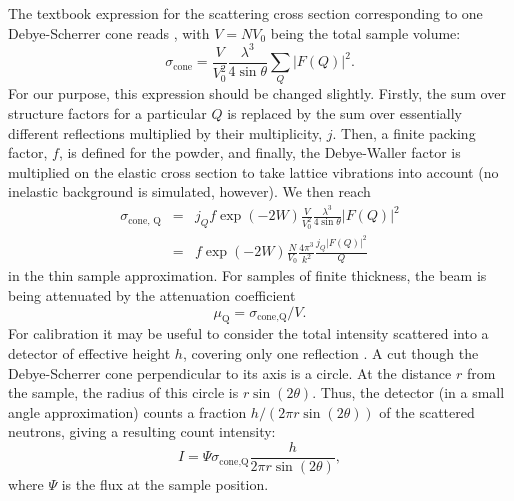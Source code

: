 The textbook expression for the scattering cross section
corresponding to one Debye-Scherrer cone reads \cite[ch.3.6]{squires}, with $V=N V_0$ being the total sample volume:
\begin{equation}
\sigma_\textrm{cone}
  = \frac{V}{V_0^2} \frac{\lambda^3}{4 \sin \theta} \sum_Q |F(Q)|^2 .
\end{equation}
For our purpose, this expression should be changed slightly.
Firstly, the sum over structure factors for a particular $Q$ is replaced
by the sum over essentially different reflections multiplied by their
multiplicity, $j$. Then, a finite packing factor, $f$, is defined for the powder,
and finally, the Debye-Waller factor is multiplied on the elastic cross section
to take lattice vibrations into account (no inelastic background is simulated,
however). We then reach
\begin{eqnarray}
\sigma_\textrm{cone, Q}
 & = & j_Q f \exp(-2W) \frac{V}{V_0^2} \frac{\lambda^3}{4 \sin \theta} |F(Q)|^2 \\
 & = & f \exp(-2W) \frac{N}{V_0} \frac{4\pi^3}{k^2} \frac{j_Q |F(Q)|^2}{Q}
\end{eqnarray}
in the thin sample approximation. For samples of finite thickness, the
beam is being attenuated by the attenuation coefficient
\begin{equation}
\label{e:attenu}
\mu_\textrm{Q} = \sigma_\textrm{cone,Q} / V .
\end{equation}
For calibration it may be useful to consider the total intensity
scattered into a detector of effective height $h$, covering only
one reflection \cite[ch.3.6]{squires}.
A cut though the Debye-Scherrer cone perpendicular to its axis
is a circle. At the distance $r$ from the sample, the radius of this
circle is $r \sin(2\theta)$. Thus, the detector (in a small angle
approximation) counts a fraction $h / (2 \pi r \sin(2 \theta))$
of the scattered neutrons, giving a resulting count intensity:
\begin{equation}
I = \Psi \sigma_\textrm{cone,Q} \frac{h}{2 \pi r \sin(2\theta)} ,
\end{equation}
where $\Psi$ is the flux at the sample position.


